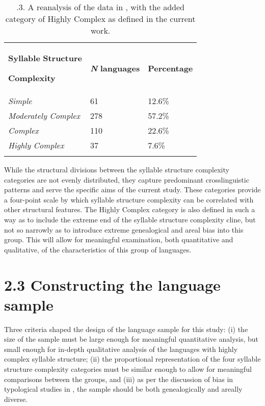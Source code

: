 \begin{table}
\begin{tabularx}{\textwidth}{XXX}
\lsptoprule

\textbf{Syllable} \textbf{Structure} 

\textbf{Complexity} & \textbf{\textit{N}} \textbf{languages} & \textbf{Percentage}\\
\textit{Simple} & 61 & 12.6\%\\
\textit{Moderately} \textit{Complex} & 278 & 57.2\%\\
\textit{Complex} & 110 & 22.6\%\\
\textit{Highly} \textit{Complex} & 37 & 7.6\%\\
\lspbottomrule
\end{tabularx}
\caption{\label{tab:key:2}.3. A reanalysis of the data in \citet{Maddieson2013a}, with the added category of Highly Complex as defined in the current work.}
\end{table}

  While the structural divisions between the syllable structure complexity categories are not evenly distributed, they capture predominant crosslinguistic patterns and serve the specific aims of the current study. These categories provide a four-point scale by which syllable structure complexity can be correlated with other structural features. The Highly Complex category is also defined in such a way as to include the extreme end of the syllable structure complexity cline, but not so narrowly as to introduce extreme genealogical and areal bias into this group. This will allow for meaningful examination, both quantitative and qualitative, of the characteristics of this group of languages.

\section{2.3 Constructing the language sample}

  Three criteria shaped the design of the language sample for this study: (i) the size of the sample must be large enough for meaningful quantitative analysis, but small enough for in-depth qualitative analysis of the languages with highly complex syllable structure; (ii) the proportional representation of the four syllable structure complexity categories must be similar enough to allow for meaningful comparisons between the groups, and (iii) as per the discussion of bias in typological studies in , the sample should be both genealogically and areally diverse.

